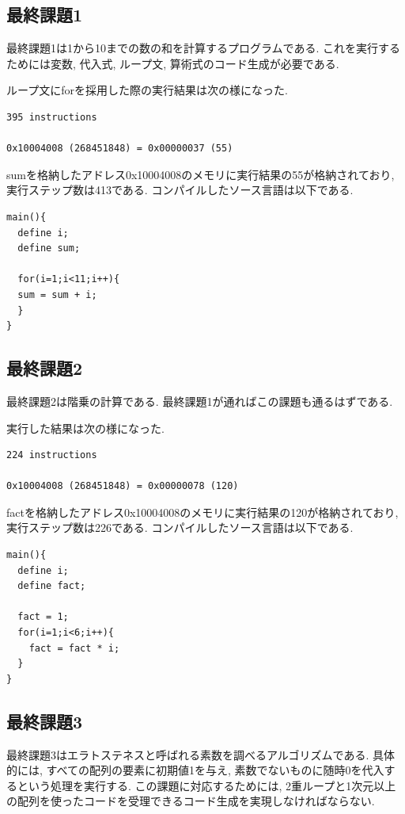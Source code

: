 \documentclass[a4j]{jarticle}
\begin{document}
\subsection{最終課題1}

最終課題1は1から10までの数の和を計算するプログラムである. これを実行するためには変数, 代入式, ループ文, 算術式のコード生成が必要である. 

ループ文にforを採用した際の実行結果は次の様になった.
\begin{verbatim}
395 instructions

0x10004008 (268451848) = 0x00000037 (55)
\end{verbatim}
sumを格納したアドレス0x10004008のメモリに実行結果の55が格納されており, 実行ステップ数は413である. 
コンパイルしたソース言語は以下である.
\begin{verbatim}
main(){
  define i;
  define sum;

  for(i=1;i<11;i++){
  sum = sum + i;
  }
}
\end{verbatim}

\subsection{最終課題2}

最終課題2は階乗の計算である. 最終課題1が通ればこの課題も通るはずである. 

実行した結果は次の様になった. 
\begin{verbatim}
224 instructions

0x10004008 (268451848) = 0x00000078 (120)
\end{verbatim}
factを格納したアドレス0x10004008のメモリに実行結果の120が格納されており, 実行ステップ数は226である.
コンパイルしたソース言語は以下である.
\begin{verbatim}
main(){
  define i;
  define fact;

  fact = 1;
  for(i=1;i<6;i++){
    fact = fact * i;
  }
}
\end{verbatim}

\subsection{最終課題3}

最終課題3はエラトステネスと呼ばれる素数を調べるアルゴリズムである. 具体的には, すべての配列の要素に初期値1を与え, 素数でないものに随時0を代入するという処理を実行する. この課題に対応するためには, 2重ループと1次元以上の配列を使ったコードを受理できるコード生成を実現しなければならない. 
\end{document}
